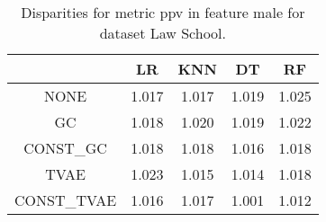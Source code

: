 \begin{table}
\caption{Disparities for metric ppv in feature male for dataset Law School.}
\label{tab:disp-LAW SCHOOL-male-ppv}
\begin{tabular}{ccccc}
\toprule
 & LR & KNN & DT & RF \\
\midrule
NONE & 1.017 & 1.017 & 1.019 & 1.025 \\
GC & 1.018 & 1.020 & 1.019 & 1.022 \\
CONST\_GC & 1.018 & 1.018 & 1.016 & 1.018 \\
TVAE & 1.023 & 1.015 & 1.014 & 1.018 \\
CONST\_TVAE & 1.016 & 1.017 & 1.001 & 1.012 \\
\bottomrule
\end{tabular}
\end{table}
